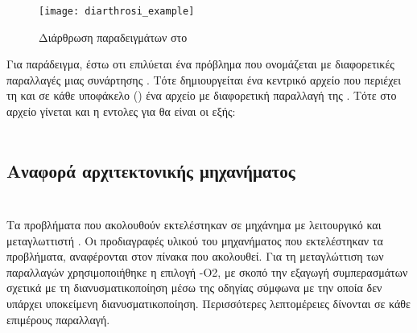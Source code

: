 \begin{center}
\begin{figure}[h]
\centering
\texttt{[image: diarthrosi\_example]}
\captionsetup{justification=centering, singlelinecheck=false}
\caption{Διάρθρωση παραδειγμάτων στο \href{https://github.com/gkonto/openmp/}{\emph{}}}
\label{fig:diarthrosi_example}
\end{figure}
\end{center}

Για παράδειγμα, έστω οτι επιλύεται ένα πρόβλημα που ονομάζεται \emph{} με διαφορετικές παραλλαγές μιας
συνάρτησης \emph{}. Τότε δημιουργείται ένα κεντρικό αρχείο \emph{} που περιέχει τη
\emph{} και σε κάθε υποφάκελο (\emph{}) ένα αρχείο \emph{} με διαφορετική παραλλαγή
της \emph{}. Τότε στο αρχείο  γίνεται \emph{} και η εντολες για
\emph{} θα είναι οι εξής:\\
\\
\clearpage
\subsection{Αναφορά αρχιτεκτονικής μηχανήματος}
\subparagraph{}
\ \\
Τα προβλήματα που ακολουθούν εκτελέστηκαν σε μηχάνημα με λειτουργικό \emph{} και μεταγλωττιστή
\emph{}. Οι προδιαγραφές υλικού του μηχανήματος που εκτελέστηκαν τα προβλήματα, αναφέρονται στον πίνακα που ακολουθεί. Για τη μεταγλώττιση των παραλλαγών χρησιμοποιήθηκε η επιλογή -Ο2, με σκοπό την εξαγωγή συμπερασμάτων σχετικά με τη διανυσματικοποίηση μέσω της οδηγίας \emph{} σύμφωνα με την οποία δεν υπάρχει υποκείμενη διανυσματικοποίηση. Περισσότερες λεπτομέρειες δίνονται σε κάθε επιμέρους παραλλαγή.

